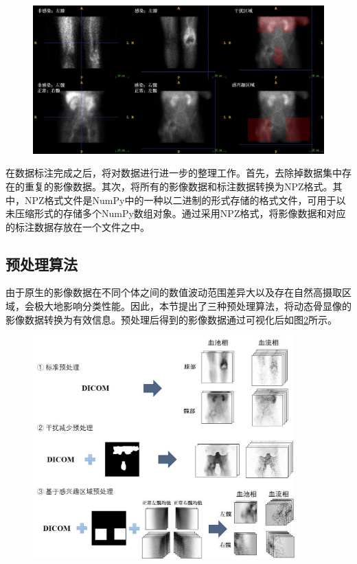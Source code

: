 \begin{figure}[htbp]
  \centering
  \includegraphics[width=\textwidth]{figures/chap03_label.jpg}
  \label{fig:chap03_label}
\end{figure}

在数据标注完成之后，将对数据进行进一步的整理工作。首先，去除掉数据集中存在的重复的影像数据。其次，将所有的影像数据和标注数据转换为NPZ格式。其中，NPZ格式文件是NumPy\cite{harris2020array}中的一种以二进制的形式存储的格式文件，可用于以未压缩形式的存储多个NumPy数组对象。通过采用NPZ格式，将影像数据和对应的标注数据存放在一个文件之中。

\subsection{预处理算法}

由于原生的影像数据在不同个体之间的数值波动范围差异大以及存在自然高摄取区域，会极大地影响分类性能。因此，本节提出了三种预处理算法，将动态骨显像的影像数据转换为有效信息。预处理后得到的影像数据通过可视化后如图\ref{fig:chap03_algorithm}所示。

\begin{figure}[htbp]
  \centering
  \includegraphics[width=0.9\textwidth]{figures/chap03_algorithm.jpg}
  \label{fig:chap03_algorithm}
\end{figure}

